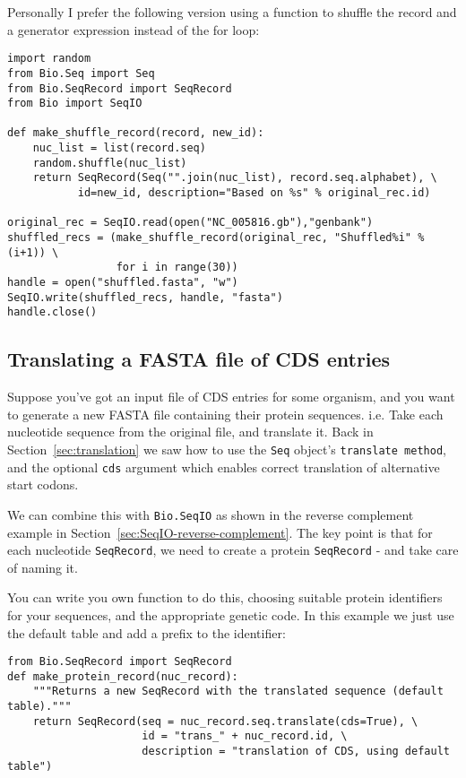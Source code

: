 \documentclass{report}
\begin{document}
Personally I prefer the following version using a function to shuffle the record
and a generator expression instead of the for loop:

\begin{verbatim}
import random
from Bio.Seq import Seq
from Bio.SeqRecord import SeqRecord
from Bio import SeqIO

def make_shuffle_record(record, new_id):
    nuc_list = list(record.seq)
    random.shuffle(nuc_list)
    return SeqRecord(Seq("".join(nuc_list), record.seq.alphabet), \
           id=new_id, description="Based on %s" % original_rec.id)
   
original_rec = SeqIO.read(open("NC_005816.gb"),"genbank")
shuffled_recs = (make_shuffle_record(original_rec, "Shuffled%i" % (i+1)) \
                 for i in range(30))
handle = open("shuffled.fasta", "w")
SeqIO.write(shuffled_recs, handle, "fasta")
handle.close()
\end{verbatim}

\subsection{Translating a FASTA file of CDS entries}
\label{sec:SeqIO-translate}
Suppose you've got an input file of CDS entries for some organism, and you
want to generate a new FASTA file containing their protein sequences.  i.e.
Take each nucleotide sequence from the original file, and translate it.
Back in Section~\ref{sec:translation} we saw how to use the \verb|Seq|
object's \verb|translate method|, and the optional \verb|cds| argument
which enables correct translation of alternative start codons.

We can combine this with \verb|Bio.SeqIO| as
shown in the reverse complement example in Section~\ref{sec:SeqIO-reverse-complement}.
The key point is that for each nucleotide \verb|SeqRecord|, we need to create
a protein \verb|SeqRecord| - and take care of naming it.

You can write you own function to do this, choosing suitable protein identifiers
for your sequences, and the appropriate genetic code.  In this example we just
use the default table and add a prefix to the identifier:

\begin{verbatim}
from Bio.SeqRecord import SeqRecord
def make_protein_record(nuc_record):
    """Returns a new SeqRecord with the translated sequence (default table)."""
    return SeqRecord(seq = nuc_record.seq.translate(cds=True), \
                     id = "trans_" + nuc_record.id, \
                     description = "translation of CDS, using default table")
\end{verbatim}
\end{document}
